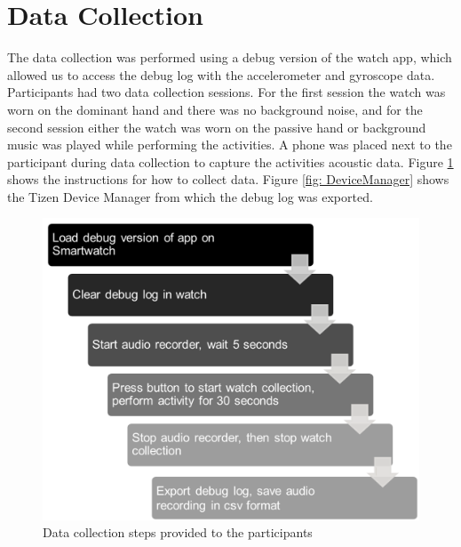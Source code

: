 \documentclass[conference]{IEEEtran}
\begin{document}
	\section{Data Collection}
	The data collection was performed using a debug version of the watch app, which allowed us to access the debug log with the accelerometer and gyroscope data.
	Participants had two data collection sessions.
	For the first session the watch was worn on the dominant hand and there was no background noise, and for the second session either the watch was worn on the passive hand or background music was played while performing the activities.
	A phone was placed next to the participant during data collection to capture the activities acoustic data.
	Figure \ref{fig: data_collection_steps} shows the instructions for how to collect data. 
	Figure \ref{fig: DeviceManager} shows the Tizen Device Manager from which the debug log was exported.
	
	\begin{figure}[h]
		\centering
		\includegraphics[scale=0.70]{data_collection_steps}
		\caption{Data collection steps provided to the participants}
		\label{fig: data_collection_steps}
	\end{figure}
	
\end{document}
